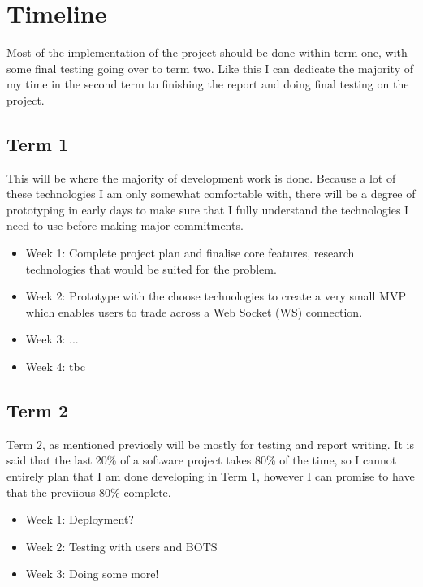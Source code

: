 \documentclass[titlepage]{article}
\begin{document}
\pagebreak

\section{Timeline}
	Most of the implementation of the project should be done within term one, with some final testing going over to term two. Like this I can dedicate the majority of my time in the second term to finishing the report and doing final testing on the project.
	
	\subsection{Term 1}
	This will be where the majority of development work is done. Because a lot of these technologies I am only somewhat comfortable with, there will be a degree of prototyping in early days to make sure that I fully understand the technologies I need to use before making major commitments.
	
	\begin{itemize}
		\item Week 1: Complete project plan and finalise core features, research technologies that would be suited for the problem.
		\item Week 2: Prototype with the choose technologies to create a very small MVP which enables users to trade across a Web Socket (WS) connection.
		\item Week 3: ...
		\item Week 4: tbc
	\end{itemize} 
	
	\subsection{Term 2}
	Term 2, as mentioned previosly will be mostly for testing and report writing. It is said that the last 20\% of a software project takes 80\% of the time, so I cannot entirely plan that I am done developing in Term 1, however I can promise to have that the previious 80\% complete.
	
	\begin{itemize}
		\item Week 1: Deployment?
		\item Week 2: Testing with users and BOTS
    \item Week 3: Doing some more!
	\end{itemize}
\end{document}

